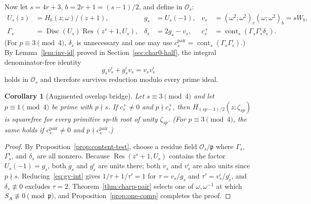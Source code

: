 \documentclass[11pt,reqno]{amsart}
\numberwithin{equation}{section}
\newtheorem{corollary}[theorem]{Corollary}
\theoremstyle{definition}
\theoremstyle{remark}
\newcommand{\Disc}{\operatorname{Disc}}
\newcommand{\Res}{\operatorname{Res}}
\newcommand{\cont}{\operatorname{cont}}
\newcommand{\poch}[3]{(#1;#2)_{#3}}
\begin{document}
Now let $s=4r+3$, $b=2r+1=(s-1)/2$, and define in $\mathcal{O}_s$:
\begin{equation}
\label{eq:cs-plus}
\begin{aligned}
U_s(z) &= H_b(z;\omega)/(z+1), & g_s &= U_s(-1), & v_s &= \poch{\omega^2}{\omega^2}{r}\poch{\omega}{\omega^2}{b} = sW_b,\\
\Gamma_s &= \Disc(U_s)\Res(z^s+1,U_s), & \delta_s &= 2g_s - v_s, & c_s^+ &= \cont_s(\Gamma_s\Gamma_s^\iota\delta_s).
\end{aligned}
\end{equation}
(For $p\equiv 3\pmod 4$, $\delta_s$ is unnecessary and one may use $c_s^{\mathrm{pair}}=\cont_s(\Gamma_s\Gamma_s^\iota)$.) By Lemma~\ref{lem:inv-id} proved in Section~\ref{sec:char0-half}, the integral denominator-free identity
\begin{equation}
\label{eq:gv-int}
g_s v_s^\iota + g_s^\iota v_s = v_s v_s^\iota
\end{equation}
holds in $\mathcal{O}_s$ and therefore survives reduction modulo every prime ideal.

\begin{corollary}[Augmented overlap bridge]
\label{cor:bridge}
Let $s\equiv 3\pmod 4$ and let $p\equiv 1\pmod 4$ be prime with $p\nmid s$. If $c_s^+\neq 0$ and $p\nmid c_s^+$, then $H_{(sp-1)/2}(z;\zeta_{sp})$ is squarefree for every primitive $sp$-th root of unity $\zeta_{sp}$. (For $p\equiv 3\pmod 4$, the same holds if $c_s^{\mathrm{pair}}\neq 0$ and $p\nmid c_s^{\mathrm{pair}}$.)
\end{corollary}

\begin{proof}
By Proposition~\ref{prop:content-test}, choose a residue field $\mathcal{O}_s/\mathfrak{p}$ where $\Gamma_s$, $\Gamma_s^\iota$, and $\delta_s$ are all nonzero. Because $\Res(z^s+1,U_s)$ contains the factor $U_s(-1)=g_s$, both $g_s$ and $g_s^\iota$ are units there; both $v_s$ and $v_s^\iota$ are also units since $p\nmid s$. Reducing~\eqref{eq:gv-int} gives $1/\tau + 1/\tau'=1$ for $\tau=v_s/g_s$ and $\tau'=v_s^\iota/g_s^\iota$, and $\delta_s\not\equiv 0$ excludes $\tau=2$. Theorem~\ref{thm:charp-pair} selects one of $\omega,\omega^{-1}$ at which $S_A\not\equiv 0\pmod{\mathfrak{p}}$, and Proposition~\ref{prop:one-comp} completes the proof.
\end{proof}
\end{document}
